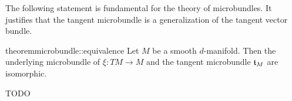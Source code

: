 \begin{myparagraph}
    The following statement is fundamental for the theory of microbundles.
    It justifies that the tangent microbundle
    is a generalization of the tangent vector bundle.
\end{myparagraph}

\begin{mystatement}{theorem}{microbundle::equivalence}
    Let $M$ be a smooth $d$-manifold.
    Then the underlying microbundle of $\xi: TM \to M$ and the tangent microbundle $\mathfrak{t}_M$
    are isomorphic. 
\end{mystatement}

\begin{myproof}
    TODO
\end{myproof}